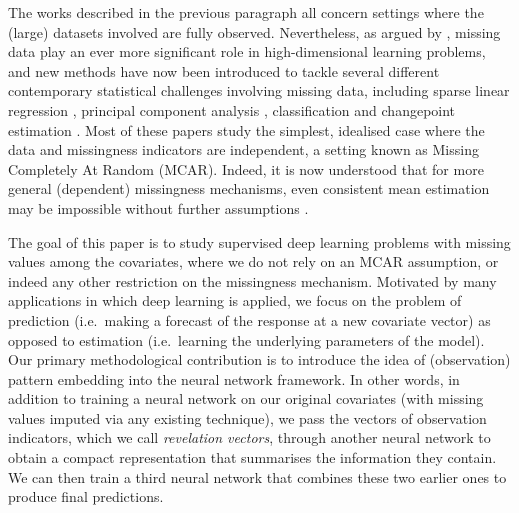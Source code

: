 \documentclass[12pt]{article}
\begin{document}
The works described in the previous paragraph all concern settings where the (large) datasets involved are fully observed.  Nevertheless, as argued by \citet{zhu2022high}, missing data play an ever more significant role in high-dimensional learning problems, and new methods have now been introduced to tackle several different contemporary statistical challenges involving missing data, including sparse linear regression \citep{loh2012high,chandrasekher2020imputation}, principal component analysis \citep{elsener2019sparse,zhu2022high}, classification \citep{cai2019high,sell2023nonparametric} and changepoint estimation \citep{follain2022high}.  Most of these papers study the simplest, idealised case where the data and missingness indicators are independent, a setting known as Missing Completely At Random (MCAR).  Indeed, it is now understood that for more general (dependent) missingness mechanisms, even consistent mean estimation may be impossible without further assumptions \citep{ma2024estimation}.

The goal of this paper is to study supervised deep learning problems with missing values among the covariates, where we do not rely on an MCAR assumption, or indeed any other restriction on the missingness mechanism.  Motivated by many applications in which deep learning is applied, we focus on the problem of prediction (i.e.~making a forecast of the response at a new covariate vector) as opposed to estimation (i.e.~learning the underlying parameters of the model).  Our primary methodological contribution is to introduce the idea of (observation) pattern embedding into the neural network framework.  In other words, in addition to training a neural network on our original covariates (with missing values imputed via any existing technique), we pass the vectors of observation indicators, which we call \emph{revelation vectors}, through another neural network to obtain a compact representation that summarises the information they contain.  We can then train a third neural network that combines these two earlier ones to produce final predictions.
\end{document}
